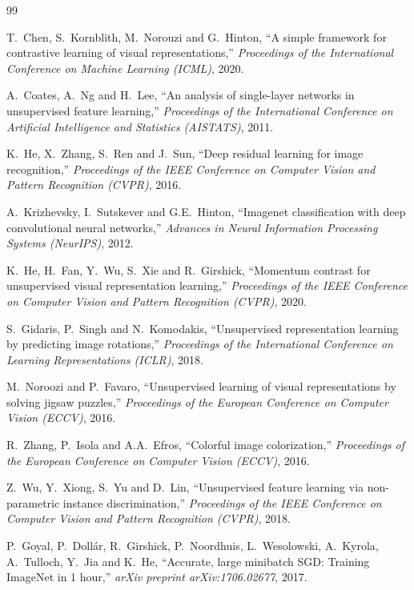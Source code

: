 \documentclass[twoside,a4paper,11pt]{article}
\begin{document}
\begin{thebibliography}{99}

T.\ Chen, S.\ Kornblith, M.\ Norouzi and G.\ Hinton,
``A simple framework for contrastive learning of visual representations,''
{\em Proceedings of the International Conference on Machine Learning (ICML)}, 2020.

A.\ Coates, A.\ Ng and H.\ Lee,
``An analysis of single-layer networks in unsupervised feature learning,''
{\em Proceedings of the International Conference on Artificial Intelligence
and Statistics (AISTATS)}, 2011.

K.\ He, X.\ Zhang, S.\ Ren and J.\ Sun,
``Deep residual learning for image recognition,''
{\em Proceedings of the IEEE Conference on Computer Vision and Pattern
Recognition (CVPR)}, 2016.

A.\ Krizhevsky, I.\ Sutskever and G.E.\ Hinton,
``Imagenet classification with deep convolutional neural networks,''
{\em Advances in Neural Information Processing Systems (NeurIPS)}, 2012.

K.\ He, H.\ Fan, Y.\ Wu, S.\ Xie and R.\ Girshick,
``Momentum contrast for unsupervised visual representation learning,''
{\em Proceedings of the IEEE Conference on Computer Vision and Pattern
Recognition (CVPR)}, 2020.

S.\ Gidaris, P.\ Singh and N.\ Komodakis,
``Unsupervised representation learning by predicting image rotations,''
{\em Proceedings of the International Conference on Learning
Representations (ICLR)}, 2018.

M.\ Noroozi and P.\ Favaro,
``Unsupervised learning of visual representations by solving jigsaw puzzles,''
{\em Proceedings of the European Conference on Computer Vision (ECCV)}, 2016.

R.\ Zhang, P.\ Isola and A.A.\ Efros,
``Colorful image colorization,''
{\em Proceedings of the European Conference on Computer Vision (ECCV)}, 2016.

Z.\ Wu, Y.\ Xiong, S.\ Yu and D.\ Lin,
``Unsupervised feature learning via non-parametric instance discrimination,''
{\em Proceedings of the IEEE Conference on Computer Vision and Pattern
Recognition (CVPR)}, 2018.

P.\ Goyal, P.\ Doll{\'a}r, R.\ Girshick, P.\ Noordhuis, L.\ Wesolowski,
A.\ Kyrola, A.\ Tulloch, Y.\ Jia and K.\ He,
``Accurate, large minibatch {SGD}: Training {ImageNet} in 1 hour,''
{\em arXiv preprint arXiv:1706.02677}, 2017.


\end{thebibliography}
\end{document}
